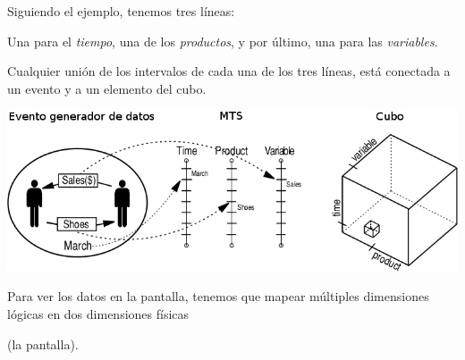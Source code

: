 \documentclass{fancyslides}
\begin{document}
\begin{frame}
\misc
{
Siguiendo el ejemplo, tenemos tres líneas:

Una para el \textit{tiempo}, una de los \textit{productos}, y por último, una para las \textit{variables}.

Cualquier unión de los intervalos de cada una de los tres líneas, está conectada a un evento y a un elemento del cubo.

\begin{center}
\includegraphics[scale=0.3]{cube_4}
\end{center}
}
\end{frame}

\begin{frame}
\end{frame}

\begin{frame}
\misc
{
Para ver los datos en la pantalla, tenemos que mapear múltiples dimensiones lógicas en dos dimensiones físicas

(la pantalla).
}
\end{frame}
\end{document}
